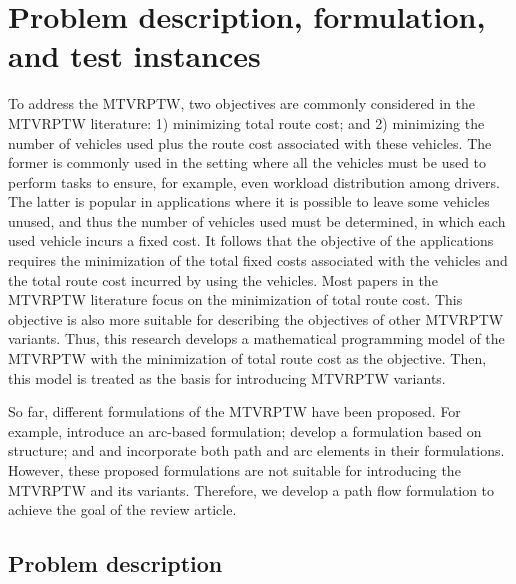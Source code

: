 
\section{Problem description, formulation, and test instances}
\label{sec:formulation}

To address the MTVRPTW, two objectives are commonly considered in the MTVRPTW literature: 1) minimizing total route cost; and 2) minimizing the number of vehicles used plus the route cost associated with these vehicles.  The former is commonly used in the setting where all the vehicles must be used to perform tasks to ensure, for example, even workload distribution among drivers.  The latter is popular in applications where it is possible to leave some vehicles unused, and thus the number of vehicles used must be determined, in which each used vehicle incurs a fixed cost.  It follows that the objective of the applications requires the minimization of the total fixed costs associated with the vehicles and the total route cost incurred by using the vehicles.  Most papers in the MTVRPTW literature focus on the minimization of total route cost.  This objective is also more suitable for describing the objectives of other MTVRPTW variants.  Thus, this research develops a mathematical programming model of the MTVRPTW with the minimization of total route cost as the objective.  Then, this model is treated as the basis for introducing MTVRPTW variants.
\newline

So far, different formulations of the MTVRPTW have been proposed. For example, \cite{hernandez2014new} introduce an arc-based formulation; \cite{paradiso2020exact} develop a formulation based on structure; and \cite{azi2010exact} and \cite{macedo2011solving} incorporate both path and arc elements in their formulations.  However, these proposed formulations are not suitable for introducing the MTVRPTW and its variants.  Therefore, we develop a path flow formulation to achieve the goal of the review article.


\subsection{Problem description}
\label{sec:math-formulation}

